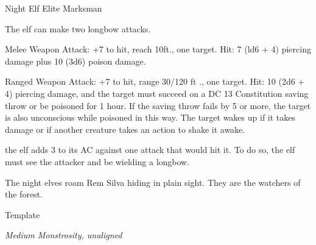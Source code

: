 \documentclass[letterpaper,10pt,twoside,twocolumn,openany]{book}
\begin{document}
\begin{monsterbox}{Night Elf Elite Marksman}
	\begin{monsteraction}[Multiattack]
		The elf can make two longbow attacks.
	\end{monsteraction}
	\begin{monsteraction}[Shortsword]
		Melee Weapon Attack: +7 to hit, reach 10ft., one target. Hit: 7 (ld6 + 4) piercing damage plus 10 (3d6) poison damage.
	\end{monsteraction}
	\begin{monsteraction}[Longbow]
		Ranged Weapon Attack: +7 to hit, range 30/120 ft ., one target. Hit: 10 (2d6 + 4) piercing damage, and the target must succeed on a DC 13 Constitution saving throw or	be poisoned for 1 hour. If the saving throw fails by 5 or more,	the target is also unconscious while poisoned in this way. The target wakes up if it takes damage or if another creature takes an action to shake it awake.
	\end{monsteraction}
	\begin{monsteraction}
		the elf adds 3 to its AC against one attack that would hit it. To do so, the elf must see the attacker and be
		wielding a longbow.
	\end{monsteraction}
	The night elves roam Rem Silva hiding in plain sight. They are the watchers of the forest. 
\end{monsterbox}

\begin{monsterbox}{Template}
	\begin{hangingpar}
		\textit{Medium Monstrosity, unaligned}
	\end{hangingpar}
	\dndline%
	\basics[%
	armorclass = 15,
	hitpoints  = 52,
	speed      = 20 ft
	]
	\dndline%
	\stats[
	STR = \stat{16}, %
	DEX = \stat{8},
	CON = \stat{15},
	INT = \stat{2},
	WIS = \stat{8},
	CHA = \stat{7}
	]
	\dndline%
	\details[%
	senses = {passive perception 9},
	challenge = 3 (700XP)
	]
	\dndline%
	\begin{monsteraction}
		
	\end{monsteraction}	
	
	\begin{monsteraction}[Bite]
		
	\end{monsteraction}
\end{monsterbox}
\end{document}
